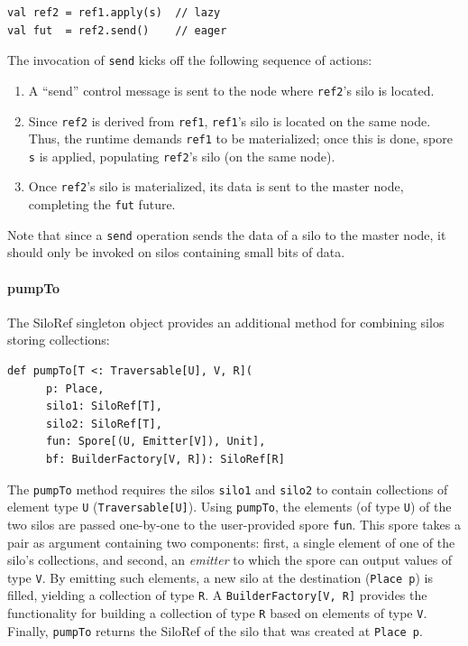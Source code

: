 \documentclass{easychair}
\begin{document}
\begin{verbatim}
val ref2 = ref1.apply(s)  // lazy
val fut  = ref2.send()    // eager
\end{verbatim}
\noindent
The invocation of \verb|send| kicks off the following sequence of actions:
\begin{enumerate}
\item A ``send'' control message is sent to the node where \verb|ref2|'s silo is located.
\item Since \verb|ref2| is derived from \verb|ref1|, \verb|ref1|'s silo is located on the same node. Thus, the runtime demands
      \verb|ref1| to be materialized; once this is done, spore \verb|s| is applied, populating \verb|ref2|'s silo (on the same node).
\item Once \verb|ref2|'s silo is materialized, its data is sent to the master node, completing the \verb|fut| future.
\end{enumerate}
\noindent
Note that since a \verb|send| operation sends the data of a silo to the master
node, it should only be invoked on silos containing small bits of data.

\paragraph{pumpTo}

The SiloRef singleton object provides an additional method for combining silos
storing collections:

\begin{verbatim}
def pumpTo[T <: Traversable[U], V, R](
      p: Place,
      silo1: SiloRef[T],
      silo2: SiloRef[T],
      fun: Spore[(U, Emitter[V]), Unit],
      bf: BuilderFactory[V, R]): SiloRef[R]
\end{verbatim}
\noindent
The \verb|pumpTo| method requires the silos \verb|silo1| and \verb|silo2| to contain collections of
element type \verb|U| (\verb|Traversable[U]|). Using \verb|pumpTo|, the elements (of type \verb|U|) of the
two silos are passed one-by-one to the user-provided spore \verb|fun|. This spore
takes a pair as argument containing two components: first, a single element of
one of the silo's collections, and second, an \emph{emitter} to which the spore can
output values of type \verb|V|. By emitting such elements, a new silo at the
destination (\verb|Place p|) is filled, yielding a collection of type \verb|R|. A
\verb|BuilderFactory[V, R]| provides the functionality for building a collection of
type \verb|R| based on elements of type \verb|V|. Finally, \verb|pumpTo| returns the SiloRef of the
silo that was created at \verb|Place p|.
\end{document}
